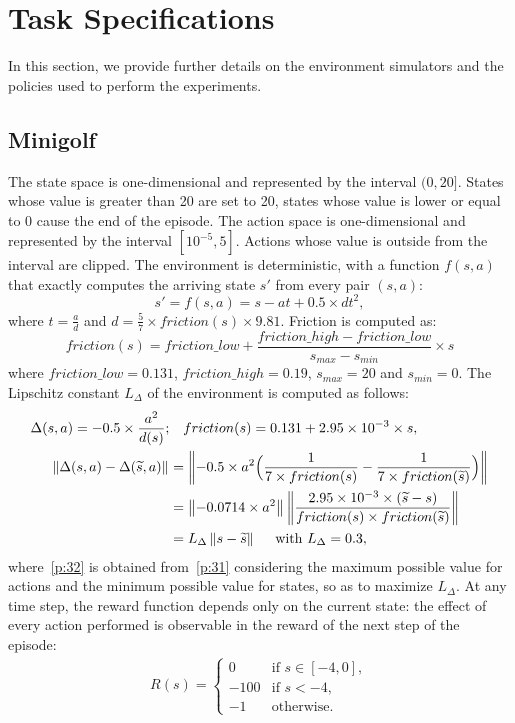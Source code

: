 \section{Task Specifications}\label{sec:app3}
In this section, we provide further details on the environment simulators and the policies used to perform the experiments.

\subsection{Minigolf}
The state space is one-dimensional and represented by the interval $(0,20]$. States whose value is greater than 20 are set to 20, states whose value is lower or equal to 0 cause the end of the episode. The action space is one-dimensional and represented by the interval $[10^{-5}, 5]$. Actions whose value is outside from the interval are clipped. The environment is deterministic, with a function $f(s,a)$ that exactly computes the arriving state $s'$ from every pair $(s,a)$:
\[
s'=f(s,a) = s - at + 0.5 \times dt^2,
\]
where $t=\frac{a}{d}$ and $d = \frac{5}{7} \times friction(s) \times 9.81$.
Friction is computed as:
\[
friction(s) = friction\_low + \frac{friction\_high - friction\_low}{s_{max} - s_{min}} \times s
\]
where $friction\_low=0.131$, $friction\_high=0.19$, $s_{max}=20$ and $s_{min}=0$. The Lipschitz constant $L_{\Delta}$ of the environment is computed as follows:\\
\begin{align}
\Delta(s,a) = -0.5 \times \frac{a^2}{d(s)}; &\quad friction(s) = 0.131 + 2.95 \times 10^{-3} \times s, \nonumber\\
\left\|\Delta(s,a) - \Delta(\widetilde{s},a)\right\|_{} &= \left\| -0.5 \times a^2 \Big(\frac{1}{7 \times friction(s)} - \frac{1}{7 \times friction(\widetilde{s})} \Big)\right\|_{} \nonumber\\
&= \left\|-0.0714 \times a^2\right\|_{}\left\|\frac {2.95 \times 10^{-3} \times (\widetilde{s} -s)} {friction(s) \times friction(\widetilde{s})}\right\|_{}\label{p:31}\\
&= L_{\Delta} \left\|s - \widetilde{s}\right\|_{} \quad \text{ with }L_{\Delta}=0.3, \label{p:32}
\end{align}
where~\eqref{p:32} is obtained from~\eqref{p:31} considering the maximum possible value for actions and the minimum possible value for states, so as to maximize $L_{\Delta}$.
At any time step, the reward function depends only on the current state: the effect of every action performed is observable in the reward of the next step of the episode: 
\begin{align}
R(s) = 
\begin{cases}
0 & \text{if } s \in [-4,0],\\
-100 & \text{if } s < -4,\\
-1 & \text{otherwise}.
\end{cases} \nonumber
\end{align}

